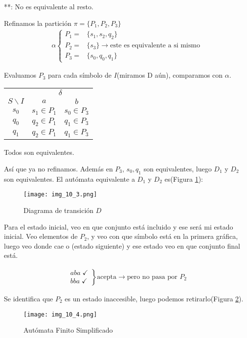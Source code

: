 **: No es equivalente al resto.

Refinamos la partición $\pi=\{P_1,P_2,P_3\}$
\begin{align*}
\alpha \left \{
\begin{array}{ll}
P_1=	&	\{s_1,s_2,q_2\}	\\
P_2=	&	\{s_3\}\rightarrow \mbox{este es equivalente a si mismo} \\
P_3=	&	\{s_0,q_0,q_1\}
\end{array}\right.
\end{align*}

Evaluamos $P_3$ para cada símbolo de $I$(miramos D aún), comparamos con $\alpha$.
\begin{center}
\begin{tabular}{c|cc}
				&\multicolumn{2}{c}{$\delta$}	\\
$S\backslash I$	&$a$			&$b$			\\ \hline
$s_0$			&$s_1\in P_1$	&$s_0\in P_3$	\\
$q_0$			&$q_2\in P_1$	&$q_1\in P_3$	\\
$q_1$			&$q_2\in P_1$	&$q_1\in P_3$	
\end{tabular}
\end{center}
Todos son equivalentes.

Así que ya no refinamos. Además en $P_3$, $s_0,q_1$ son equivalentes, luego $D_1$ y $D_2$ son equivalentes. El autómata equivalente a $D_1$ y $D_2$ es(Figura \ref{img_10_3}):
\begin{figure}[h!]
\centering
\texttt{[image: img\_10\_3.png]}
\caption{Diagrama de transición $D$}\label{img_10_3}
\end{figure}
Para el estado inicial, veo en que conjunto está incluido y ese será mi estado inicial. Veo elementos de $P_2$, y veo con que símbolo está en la primera gráfica, luego veo donde cae o (estado siguiente) y ese estado veo en que conjunto final está.

\begin{align*}
\left. \begin{array}{c}
aba \; \checkmark \\
bba \; \checkmark \end{array}\right \} \mbox{acepta} \rightarrow \mbox{pero no pasa por } P_2
\end{align*}

Se identifica que $P_2$ es un estado inaccesible, luego podemos retirarlo(Figura \ref{img_10_4}).
\begin{figure}[h!]
\centering
\texttt{[image: img\_10\_4.png]}
\caption{Autómata Finito Simplificado}\label{img_10_4}
\end{figure}


